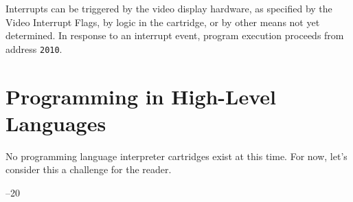 \documentclass[12pt]{{memoir}}
\begin{document}
Interrupts can be triggered by the video display hardware, as specified by the Video Interrupt Flags, by logic in the cartridge, or by other means not yet determined. In response to an interrupt event, program execution proceeds from address \texttt{2010}.

\chapter{Programming in High-Level Languages}

No programming language interpreter cartridges exist at this time. For now, let's consider this a challenge for the reader.

\cleartoverso
\pagestyle{empty}

\noindent\thetitle\hfill{}--20 \theauthor
\end{document}
